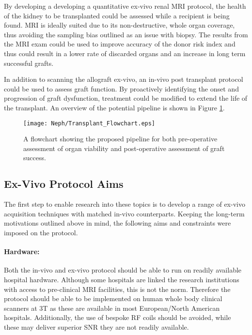 By developing a developing a quantitative ex-vivo renal \ac{MRI} protocol, the health of the kidney to be transplanted could be assessed while a recipient is being found. \ac{MRI} is ideally suited due to its non-destructive, whole organ coverage, thus avoiding the sampling bias outlined as an issue with biopsy. The results from the \ac{MRI} exam could be used to improve accuracy of the donor risk index and thus could result in a lower rate of discarded organs and an increase in long term successful grafts. 

In addition to scanning the allograft ex-vivo, an in-vivo post transplant protocol could be used to assess graft function. By proactively identifying the onset and progression of graft dysfunction, treatment could be modified to extend the life of the transplant. An overview of the potential pipeline is shown in Figure \ref{fig:ex_transplant_flowchart}.
\begin{figure}[H]
	\centering
	\texttt{[image: Neph/Transplant\_Flowchart.eps]}
	\caption{A flowchart showing the proposed pipeline for both pre-operative assessment of organ viability and post-operative assessment of graft success.}
	\label{fig:ex_transplant_flowchart}	
\end{figure}

\newpage
\subsection{Ex-Vivo Protocol Aims}

The first step to enable research into these topics is to develop a range of ex-vivo acquisition techniques with matched in-vivo counterparts. Keeping the long-term motivations outlined above in mind, the following aims and constraints were imposed on the protocol.

\paragraph{Hardware:} Both the in-vivo and ex-vivo protocol should be able to run on readily available hospital hardware. Although some hospitals are linked the research institutions with access to pre-clinical \ac{MRI} facilities, this is not the norm. Therefore the protocol should be able to be implemented on human whole body clinical scanners at 3T as these are available in most European/North American hospitals. Additionally, the use of bespoke \ac{RF} coils should be avoided, while these may deliver superior \ac{SNR} they are not readily available.

